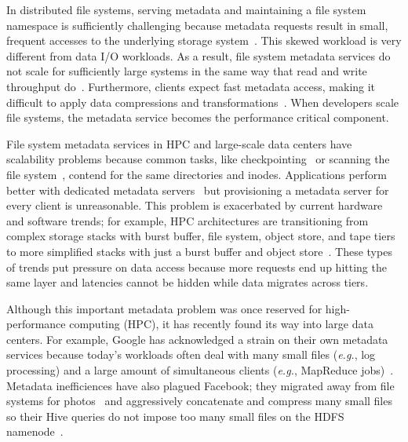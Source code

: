 In distributed file systems, serving metadata and maintaining a file system
namespace is sufficiently challenging because metadata requests result in
small, frequent accesses to the underlying storage
system~\cite{roselli:atec2000-FS-workloads}.  This skewed workload is very
different from data I/O workloads. As a result, file system metadata services
do not scale for sufficiently large systems in the same way that read and write
throughput do~\cite{abad:techreport2012-fstrace, abad:ucc2012-mimesis,
alam:pdsw2011-metadata-scaling, weil:osdi2006-ceph}.  Furthermore, clients
expect fast metadata access, making it difficult to apply data compressions and
transformations~\cite{leung:atc2008-nfs-trace}. When developers scale file
systems, the metadata service becomes the performance critical component. 

File system metadata services in HPC and large-scale data centers have
scalability problems because common tasks, like
checkpointing~\cite{bent_plfs_2009} or scanning the file
system~\cite{zheng:pdsw2014-batchfs}, contend for the same directories and
inodes. Applications perform better with dedicated metadata
servers~\cite{sevilla:sc15-mantle, ren:sc2014-indexfs} but provisioning a
metadata server for every client is unreasonable. This problem is exacerbated
by current hardware and software trends; for example, HPC architectures are
transitioning from complex storage stacks with burst buffer, file system,
object store, and tape tiers to more simplified stacks with just a burst buffer
and object store~\cite{bent:login16-hpc-trends}. These types of trends put
pressure on data access because more requests end up hitting the same layer and
latencies cannot be hidden while data migrates across tiers.



Although this important metadata problem was once reserved for high-performance
computing (HPC), it has recently found its way into large data centers. For
example, Google has acknowledged a strain on their own metadata services
because today's workloads often deal with many small files ({\it e.g.}, log
processing) and a large amount of simultaneous clients ({\it e.g.}, MapReduce
jobs)~\cite{mckusick:acm2010-gfs-evolution}. Metadata inefficiences have also
plagued Facebook; they migrated away from file systems for
photos~\cite{beaver:osdi2010-haystack} and aggressively concatenate and
compress many small files so their Hive queries do not impose too many small
files on the HDFS namenode~\cite{thusoo:sigmod2010-facebook-infrastructure}. 

